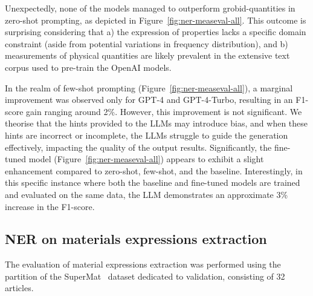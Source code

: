 
Unexpectedly, none of the models managed to outperform grobid-quantities in zero-shot prompting, as depicted in Figure~\ref{fig:ner-measeval-all}. This outcome is surprising considering that a) the expression of properties lacks a specific domain constraint (aside from potential variations in frequency distribution), and b) measurements of physical quantities are likely prevalent in the extensive text corpus used to pre-train the OpenAI models.

In the realm of few-shot prompting (Figure~\ref{fig:ner-measeval-all}), a marginal improvement was observed only for GPT-4 and GPT-4-Turbo, resulting in an F1-score gain ranging around 2\%. 
However, this improvement is not significant. 
We theorise that the hints provided to the LLMs may introduce bias, and when these hints are incorrect or incomplete, the LLMs struggle to guide the generation effectively, impacting the quality of the output results.
Significantly, the fine-tuned model (Figure~\ref{fig:ner-measeval-all}) appears to exhibit a slight enhancement compared to zero-shot, few-shot, and the baseline. Interestingly, in this specific instance where both the baseline and fine-tuned models are trained and evaluated on the same data, the LLM demonstrates an approximate 3\% increase in the F1-score.

\subsection{NER on materials expressions extraction}
\label{sec:results-ner-materials}
The evaluation of material expressions extraction was performed using the partition of the SuperMat~\cite{lfoppiano2021supermat} dataset dedicated to validation, consisting of 32 articles.


